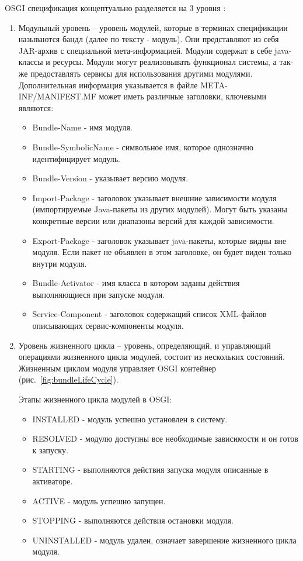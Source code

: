 OSGI спецификация концептуально разделяется на 3 уровня \cite{osgiInAction}:
\begin{enumerate}
\item Модульный уровень – уровень модулей, которые в терминах спецификации называются бандл (далее по тексту - модуль). Они представляют из себя JAR-архив с специальной мета-информацией. Модули содержат в себе java-классы и ресурсы. Модули могут реализовывать функционал системы, а так-же предоставлять сервисы для использования другими модулями. Дополнительная информация указывается в файле META-INF/MANIFEST.MF может иметь различные заголовки, ключевыми являются:
\begin{itemize}
\item Bundle-Name - имя модуля.
\item Bundle-SymbolicName - символьное имя, которое однозначно идентифицирует модуль.
\item Bundle-Version - указывает версию модуля.
\item Import-Package - заголовок указывает внешние зависимости модуля (импортируемые Java-пакеты из других модулей). Могут быть указаны конкретные версии или диапазоны версий для каждой зависимости.
\item Export-Package - заголовок указывает java-пакеты, которые видны вне модуля. Если пакет не объявлен в этом заголовке, он будет виден только внутри модуля.
\item Bundle-Activator - имя класса в котором заданы действия выполняющиеся при запуске модуля.
\item Service-Component - заголовок содержащий список XML-файлов описывающих сервис-компоненты модуля.
\end{itemize}

\item Уровень жизненного цикла – уровень, определяющий, и управляющий операциями жизненного цикла модулей, состоит из нескольких состояний. Жизненным циклом модуля управляет OSGI контейнер (рис.~\ref{fig:bundleLifeCycle}).

Этапы жизненного цикла модулей в OSGI:
\begin{itemize}
\item INSTALLED - модуль успешно установлен в систему.
\item RESOLVED - модулю доступны все необходимые зависимости и он готов к запуску.
\item STARTING - выполняются действия запуска модуля описанные в активаторе.
\item ACTIVE - модуль успешно запущен.
\item STOPPING - выполняются действия остановки модуля.
\item UNINSTALLED - модуль удален, означает завершение жизненного цикла модуля.
\end{itemize}


\end{enumerate}

